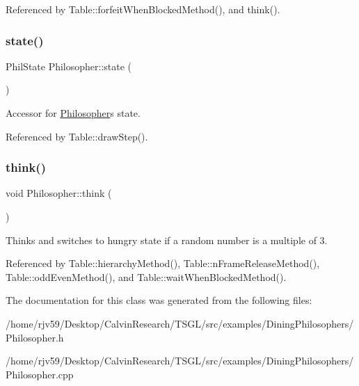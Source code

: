 Referenced by Table\+::forfeit\+When\+Blocked\+Method(), and think().

\mbox{\label{class_philosopher_a04862832ab8b79fd45ddec5e0546775a}} 
\subsubsection{\texorpdfstring{state()}{state()}}
{\footnotesize\ttfamily Phil\+State Philosopher\+::state (\begin{DoxyParamCaption}{ }\end{DoxyParamCaption})\hspace{0.3cm}{\ttfamily [inline]}}

Accessor for \hyperlink{class_philosopher}{Philosopher}\textquotesingle{}s state. 

Referenced by Table\+::draw\+Step().

\mbox{\label{class_philosopher_adb8c98df2b7cf8f2d2cde2daa18c731a}} 
\subsubsection{\texorpdfstring{think()}{think()}}
{\footnotesize\ttfamily void Philosopher\+::think (\begin{DoxyParamCaption}{ }\end{DoxyParamCaption})}

Thinks and switches to hungry state if a random number is a multiple of 3. 

Referenced by Table\+::hierarchy\+Method(), Table\+::n\+Frame\+Release\+Method(), Table\+::odd\+Even\+Method(), and Table\+::wait\+When\+Blocked\+Method().



The documentation for this class was generated from the following files\+:\begin{DoxyCompactItemize}
\item 
/home/rjv59/\+Desktop/\+Calvin\+Research/\+T\+S\+G\+L/src/examples/\+Dining\+Philosophers/Philosopher.\+h\item 
/home/rjv59/\+Desktop/\+Calvin\+Research/\+T\+S\+G\+L/src/examples/\+Dining\+Philosophers/Philosopher.\+cpp\end{DoxyCompactItemize}
